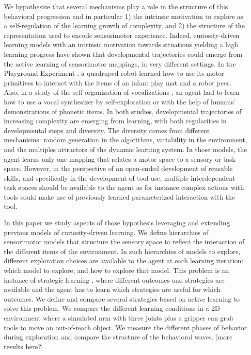 \documentclass[10pt,letterpaper]{article}
\begin{document}
	We hypothesize that several mechanisms play a role in the structure of this behavioral progression and in particular 
	1) the intrinsic motivation to explore as a self-regulation of the learning growth of complexity, and 
	2) the structure of the representation used to encode sensorimotor experience.	
	Indeed, curiosity-driven learning models with an intrinsic motivation towards situations yielding a high learning progress 
	have shown that developmental trajectories could emerge from the active learning of sensorimotor mappings, in very different settings.
	In the Playground Experiment \cite{oudeyer_what_2007}, a quadruped robot learned how to use its motor primitives to interact with the items of an infant play mat and a robot peer.
	Also, in a study of the self-organization of vocalizations \cite{moulin-frier_self-organization_2014}, an agent had to learn how to
	use a vocal synthesizer by self-exploration or with the help of humans' demonstrations of phonetic items. 
	In both studies, developmental trajectories of increasing complexity are emerging from learning, with both regularities in developmental steps and diversity.
	The diversity comes from different mechanisms: random generation in the algorithms, variability in the environment, and the multiples attractors of the dynamic learning system.
	In those models, the agent learns only one mapping that relates a motor space to a sensory or task space. 
	However, in the perspective of an open-ended development of reusable skills, and specifically in the development of tool use, multiple interdependent task spaces should be available to the agent
	as for instance complex actions with tools could make use of previously learned parameterized interaction with the tool.
	
	In this paper we study aspects of those hypothesis leveraging and extending previous models of curiosity-driven learning.
	We define hierarchies of sensorimotor models that structure the sensory space to reflect the interaction of the different items of the environment.
	In such hierarchies of models to explore, different exploration choices are available to the agent at each learning iteration: which model to explore, and how to explore that model.
	This problem is an instance of strategic learning \cite{nguyen2012}, 
	where different outcomes and strategies are available and the agent has to learn which strategies are useful for which outcomes. 
	We define and compare several strategies based on active learning to solve this problem.
	We compare the different learning conditions in a $2$D environment where a simulated arm with three joints plus a gripper can grab tools to move an out-of-reach object.
	We measure the different phases of behavior during exploration and compare the structure of the behavioral waves. [more results here?]
	
\end{document}

